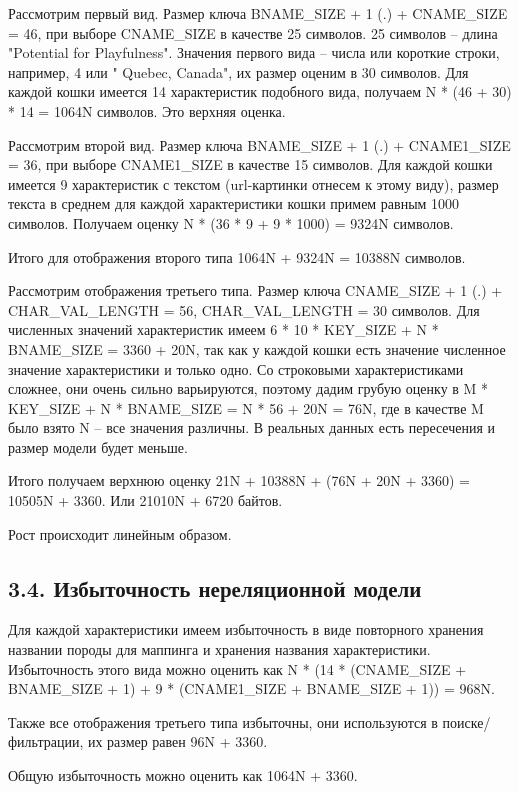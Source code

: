 Рассмотрим первый вид. Размер ключа BNAME\_SIZE + 1 (.) + CNAME\_SIZE = 46, при выборе CNAME\_SIZE в качестве 25 символов.
25 символов -- длина "Potential for Playfulness". Значения первого вида -- числа или короткие строки, например, 4 или "
Quebec, Canada", их размер оценим в 30 символов. Для каждой кошки имеется 14 характеристик подобного вида,
получаем N * (46 + 30) * 14 = 1064N символов. Это верхняя оценка.

Рассмотрим второй вид. Размер ключа BNAME\_SIZE + 1 (.) + CNAME1\_SIZE = 36, при выборе CNAME1\_SIZE в качестве 15
символов. Для каждой кошки имеется 9 характеристик с текстом (url-картинки отнесем к этому виду), размер текста в
среднем для каждой характеристики кошки примем равным 1000 символов. Получаем оценку N * (36 * 9 + 9 * 1000) = 9324N
символов.

Итого для отображения второго типа 1064N + 9324N = 10388N символов.

Рассмотрим отображения третьего типа. Размер ключа CNAME\_SIZE + 1 (.) + CHAR\_VAL\_LENGTH = 56, CHAR\_VAL\_LENGTH = 30
символов. Для численных значений характеристик имеем 6 * 10 * KEY\_SIZE + N * BNAME\_SIZE = 3360 + 20N, так как у каждой
кошки есть значение численное значение характеристики и только одно. Со строковыми характеристиками сложнее, они очень
сильно варьируются, поэтому дадим грубую оценку в M * KEY\_SIZE + N * BNAME\_SIZE = N * 56 + 20N = 76N, где в качестве M
было взято N -- все значения различны. В реальных данных есть пересечения и размер модели будет меньше.

Итого получаем верхнюю оценку 21N + 10388N + (76N + 20N + 3360) = 10505N + 3360.
Или 21010N + 6720 байтов.

Рост происходит линейным образом.

\subsection*{3.4. Избыточность нереляционной модели}

Для каждой характеристики имеем избыточность в виде повторного хранения названии породы для маппинга и хранения названия
характеристики. Избыточность этого вида можно оценить
как N * (14 * (CNAME\_SIZE + BNAME\_SIZE + 1) + 9 * (CNAME1\_SIZE + BNAME\_SIZE + 1)) = 968N.

Также все отображения третьего типа избыточны, они используются в поиске/фильтрации, их размер равен 96N + 3360.

Общую избыточность можно оценить как 1064N + 3360.

